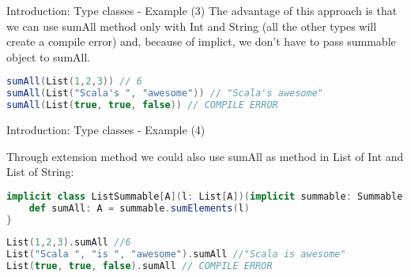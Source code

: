 \begin{frame}[fragile]{Introduction: Type classes - Example (3)}
	The advantage of this approach is that we can use sumAll method only with Int and String (all the other types will create 
	a compile error) and, because of implict, we don't have to pass summable object to sumAll.
	
\begin{lstlisting}[language=scala]
sumAll(List(1,2,3)) // 6
sumAll(List("Scala's ", "awesome")) // "Scala's awesome"
sumAll(List(true, true, false)) // COMPILE ERROR				
\end{lstlisting}

\end{frame}
	
\begin{frame}[fragile]{Introduction: Type classes - Example (4)}
	
	Through extension method we could also use sumAll as method in List of Int and List of String:
\begin{lstlisting}[language=scala]
implicit class ListSummable[A](l: List[A])(implicit summable: Summable[A]) {
	def sumAll: A = summable.sumElements(l)
}
\end{lstlisting}	
	
	\pause
	
\begin{lstlisting}[language=scala]
List(1,2,3).sumAll //6
List("Scala ", "is ", "awesome").sumAll //"Scala is awesome"
List(true, true, false).sumAll // COMPILE ERROR
\end{lstlisting}
\end{frame}